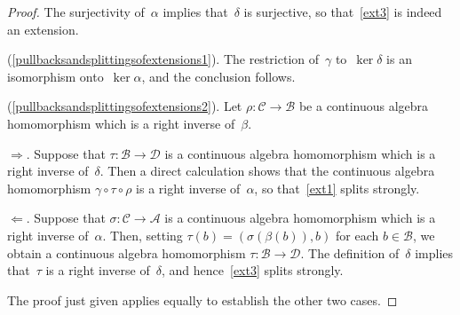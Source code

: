 \documentclass[11pt,reqno]{amsart}
\theoremstyle{definition}
\numberwithin{equation}{section}
\newcommand{\romanref}[1]{{\normalfont\textrm{(\ref{#1})}}}
\begin{document}
\begin{proof}
The surjectivity of~$\alpha$ implies that~$\delta$ is surjective, so
that~\eqref{ext3} is indeed an extension.

\romanref{pullbacksandsplittingsofextensions1}.  The restriction
of~$\gamma$ to~$\ker\delta$ is an isomorphism onto~$\ker\alpha$, and
the conclusion follows.

\romanref{pullbacksandsplittingsofextensions2}. Let
$\rho\colon\mathscr{C}\to\mathscr{B}$ be a continuous algebra
homomorphism which is a right inverse of~$\beta$. 

$\Rightarrow$. Suppose that $\tau\colon\mathscr{B}\to\mathscr{D}$ is a
continuous algebra homomorphism which is a right inverse
of~$\delta$. Then a direct calculation shows that the continuous
algebra homomorphism $\gamma\circ\tau\circ\rho$ is a right inverse
of~$\alpha$, so that~\eqref{ext1} splits strongly.

$\Leftarrow$. Suppose that $\sigma\colon\mathscr{C}\to\mathscr{A}$ is
a continuous algebra homomorphism which is a right inverse
of~$\alpha$. Then, setting $\tau(b) = (\sigma(\beta(b)), b)$ for each
$b\in\mathscr{B}$, we obtain a continuous algebra homomorphism
\mbox{$\tau\colon\mathscr{B}\to\mathscr{D}$}. The definition
of~$\delta$ implies that~$\tau$ is a right inverse of~$\delta$, and
hence~\eqref{ext3} splits strongly.

The proof just given applies equally to establish the other two cases.
\end{proof}
\end{document}
